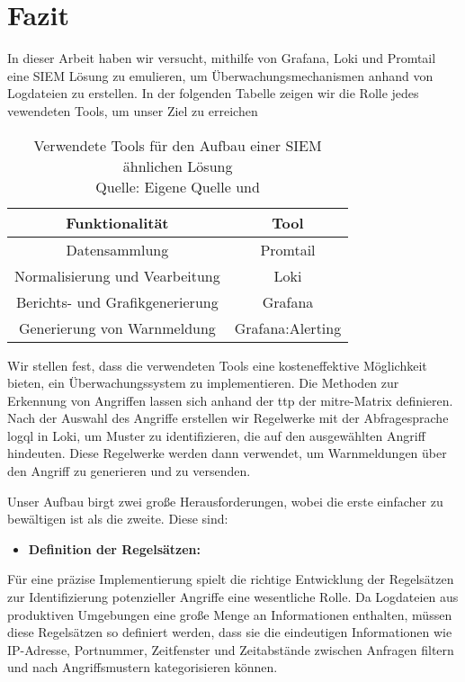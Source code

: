 \section{Fazit}

In dieser Arbeit haben wir versucht, mithilfe von Grafana, Loki und Promtail eine \gls{SIEM} Lösung zu emulieren, um Überwachungsmechanismen anhand von Logdateien zu erstellen. In der folgenden Tabelle zeigen wir die Rolle jedes vewendeten Tools, um unser Ziel zu erreichen

\begin{table}[h]
    \centering
    \begin{tabular}{|c|c|}
    \hline
    \textbf{Funktionalität}         & \textbf{Tool}    \\ \hline
    Datensammlung                   & Promtail         \\ \hline
    Normalisierung und Vearbeitung  & Loki             \\ \hline
    Berichts- und Grafikgenerierung & Grafana          \\ \hline
    Generierung von Warnmeldung     & Grafana:Alerting \\ \hline
    \end{tabular}
    \caption{Verwendete Tools für den Aufbau einer \gls{SIEM} ähnlichen Lösung\\Quelle: Eigene Quelle und \citep{Granadillo_SIEM}}
    \label{tab:my-table}
\end{table}

Wir stellen fest, dass die verwendeten Tools eine kosteneffektive Möglichkeit bieten, ein Überwachungssystem zu implementieren. Die Methoden zur Erkennung von Angriffen lassen sich anhand der \gls{ttp} der \gls{mitre}-Matrix definieren. Nach der Auswahl des Angriffe erstellen wir Regelwerke mit der Abfragesprache \gls{logql} in Loki, um Muster zu identifizieren, die auf den ausgewählten Angriff hindeuten. Diese Regelwerke werden dann verwendet, um Warnmeldungen über den Angriff zu generieren und zu versenden.

Unser Aufbau birgt zwei große Herausforderungen, wobei die erste einfacher zu bewältigen ist als die zweite. Diese sind:

\begin{itemize}[noitemsep]
    \item \textbf{Definition der Regelsätzen:}
\end{itemize}

Für eine präzise Implementierung spielt die richtige Entwicklung der Regelsätzen zur Identifizierung potenzieller Angriffe eine wesentliche Rolle. Da Logdateien aus produktiven Umgebungen eine große Menge an Informationen enthalten, müssen diese Regelsätzen so definiert werden, dass sie die eindeutigen Informationen wie IP-Adresse, Portnummer, Zeitfenster und Zeitabstände zwischen Anfragen filtern und nach Angriffsmustern kategorisieren können.

